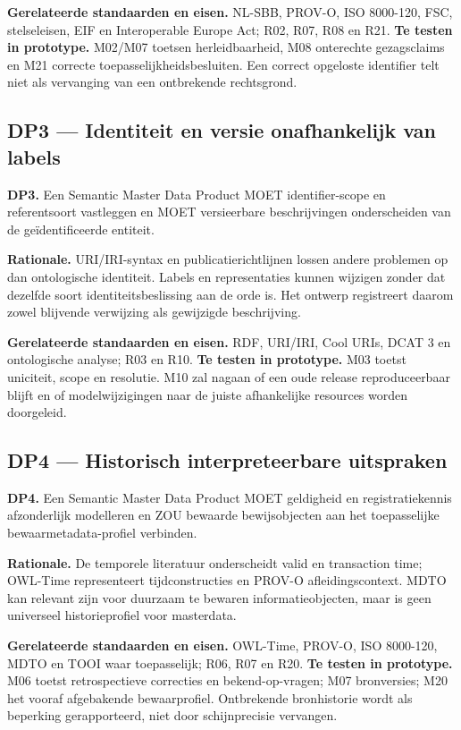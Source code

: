 \textbf{Gerelateerde standaarden en eisen.} NL-SBB, PROV-O, ISO 8000-120, FSC, stelseleisen, EIF en Interoperable Europe Act; R02, R07, R08 en R21. \textbf{Te testen in prototype.} M02/M07 toetsen herleidbaarheid, M08 onterechte gezagsclaims en M21 correcte toepasselijkheidsbesluiten. Een correct opgeloste identifier telt niet als vervanging van een ontbrekende rechtsgrond.

\subsection*{DP3 --- Identiteit en versie onafhankelijk van labels}
\textbf{DP3.} Een Semantic Master Data Product MOET identifier-scope en referentsoort vastleggen en MOET versieerbare beschrijvingen onderscheiden van de geïdentificeerde entiteit.

\textbf{Rationale.} URI/IRI-syntax en publicatierichtlijnen lossen andere problemen op dan ontologische identiteit. \citep{S38,S39,L08} Labels en representaties kunnen wijzigen zonder dat dezelfde soort identiteitsbeslissing aan de orde is. Het ontwerp registreert daarom zowel blijvende verwijzing als gewijzigde beschrijving.

\textbf{Gerelateerde standaarden en eisen.} RDF, URI/IRI, Cool URIs, DCAT 3 en ontologische analyse; R03 en R10. \textbf{Te testen in prototype.} M03 toetst uniciteit, scope en resolutie. M10 zal nagaan of een oude release reproduceerbaar blijft en of modelwijzigingen naar de juiste afhankelijke resources worden doorgeleid.

\subsection*{DP4 --- Historisch interpreteerbare uitspraken}
\textbf{DP4.} Een Semantic Master Data Product MOET geldigheid en registratiekennis afzonderlijk modelleren en ZOU bewaarde bewijsobjecten aan het toepasselijke bewaarmetadata-profiel verbinden.

\textbf{Rationale.} De temporele literatuur onderscheidt valid en transaction time; OWL-Time representeert tijdconstructies en PROV-O afleidingscontext. \citep{L14,S37,S33} MDTO kan relevant zijn voor duurzaam te bewaren informatieobjecten, maar is geen universeel historieprofiel voor masterdata. \citep{S24}

\textbf{Gerelateerde standaarden en eisen.} OWL-Time, PROV-O, ISO 8000-120, MDTO en TOOI waar toepasselijk; R06, R07 en R20. \textbf{Te testen in prototype.} M06 toetst retrospectieve correcties en bekend-op-vragen; M07 bronversies; M20 het vooraf afgebakende bewaarprofiel. Ontbrekende bronhistorie wordt als beperking gerapporteerd, niet door schijnprecisie vervangen.

